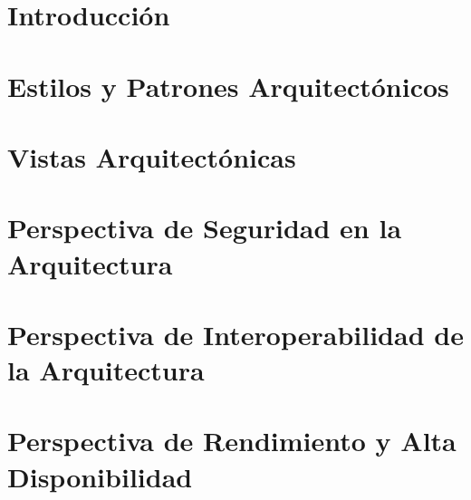 \renewcommand{\contentsname}{Contenido}
\tableofcontents
\newpage

\section{Introducción}
\label{sec:intro}


\newpage 

\section{Estilos y Patrones Arquitectónicos}
\label{sec:epa}


\newpage 

\section{Vistas Arquitectónicas}
\label{sec:va}


\newpage 

\section{Perspectiva de Seguridad en la Arquitectura}
\label{sec:psa}


\newpage 

\section{Perspectiva de Interoperabilidad de la Arquitectura}
\label{sec:pia}


\newpage

\section{Perspectiva de Rendimiento y Alta Disponibilidad}
\label{sec:prad}
